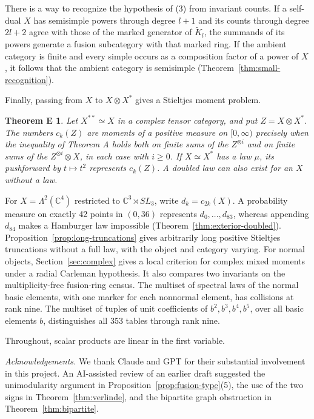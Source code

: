 \documentclass[11pt,reqno]{amsart}
\newtheorem*{theoremE}{Theorem E}
\theoremstyle{definition}
\newcommand{\CC}{\mathbb C}
\begin{document}
There is a way to recognize the hypothesis of (3) from invariant counts. If a self-dual $X$ has semisimple powers through degree $l+1$ and its counts through degree $2l+2$ agree with those of the marked generator of $\widetilde K_l$, the summands of its powers generate a fusion subcategory with that marked ring. If the ambient category is finite and every simple occurs as a composition factor of a power of $X$, it follows that the ambient category is semisimple (Theorem~\ref{thm:small-recognition}).

Finally, passing from $X$ to $X\otimes X^*$ gives a Stieltjes moment problem.
\begin{theoremE}
Let $X^{**}\simeq X$ in a complex tensor category, and put $Z=X\otimes X^*$. The numbers $c_k(Z)$ are moments of a positive measure on $[0,\infty)$ precisely when the inequality of Theorem A holds both on finite sums of the $Z^{\otimes i}$ and on finite sums of the $Z^{\otimes i}\otimes X$, in each case with $i\ge0$. If $X\simeq X^*$ has a law $\mu$, its pushforward by $t\mapsto t^2$ represents $c_k(Z)$. A doubled law can also exist for an $X$ without a law.
\end{theoremE}

For $X=\Lambda^2(\CC^4)$ restricted to $\CC^3\rtimes SL_3$, write $d_k=c_{2k}(X)$. A probability measure on exactly 42 points in $(0,36)$ represents $d_0,\ldots,d_{83}$, whereas appending $d_{84}$ makes a Hamburger law impossible (Theorem~\ref{thm:exterior-doubled}). Proposition~\ref{prop:long-truncations} gives arbitrarily long positive Stieltjes truncations without a full law, with the object and category varying. For normal objects, Section~\ref{sec:complex} gives a local criterion for complex mixed moments under a radial Carleman hypothesis. It also compares two invariants on the multiplicity-free fusion-ring census. The multiset of spectral laws of the normal basic elements, with one marker for each nonnormal element, has collisions at rank nine. The multiset of tuples of unit coefficients of $b^2,b^3,b^4,b^5$, over all basic elements $b$, distinguishes all 353 tables through rank nine.

Throughout, scalar products are linear in the first variable.

\emph{Acknowledgements.} We thank Claude and GPT for their substantial involvement in this project. An AI-assisted review of an earlier draft suggested the unimodularity argument in Proposition~\ref{prop:fusion-type}(5), the use of the two signs in Theorem~\ref{thm:verlinde}, and the bipartite graph obstruction in Theorem~\ref{thm:bipartite}.
\end{document}
